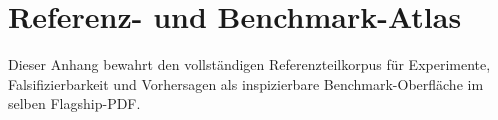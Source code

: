 \section{Referenz- und Benchmark-Atlas}
\label{sec:oc-core-1-3-reference-benchmark-atlas}

Dieser Anhang bewahrt den vollständigen Referenzteilkorpus für Experimente,
Falsifizierbarkeit und Vorhersagen als inspizierbare Benchmark-Oberfläche im
selben Flagship-PDF.

\begingroup
\let\ocappendixsection\section
\let\ocappendixsubsection\subsection
\let\ocappendixsubsubsection\subsubsection
\renewcommand{\section}{\ocappendixsubsection}
\renewcommand{\subsection}{\ocappendixsubsubsection}

\endgroup
